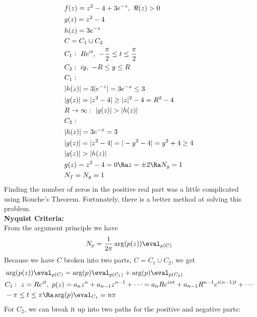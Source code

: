 \begin{align*}
    &f(z)=z^2-4+3e^{-z},\ \Re(z)>0\\
    &g(z)=z^2-4\\
    &h(z)=3e^{-z}\\
    &C=C_1\cup C_2\\
    &C_1:\ Re^{it},\ -\frac{\pi}{2}\leq t\leq \frac{\pi}{2}\\
    &C_2:\ iy,\ -R\leq y\leq R\\
    &C_1:\\
    &|h(z)|=3|e^{-z}|=3e^{-x}\leq 3\\
    &|g(z)|=|z^2-4|\geq|z|^2-4=R^2-4\\
    &R\to\infty:\ |g(z)|>|h(z)|\\
    &C_2:\\
    &|h(z)|=3e^{-x}=3\\
    &|g(z)|=|z^2-4|=|-y^2-4|=y^2+4\geq 4\\
    &|g(z)|>|h(z)|\\
    &g(z)=z^2-4=0\Ra z=\pm 2\Ra N_g=1\\
    &N_f=N_g=1
\end{align*}
Finding the number of zeros in the positive real part was a little complicated using Rouche's Theorem. Fortunately, there is a better method at solving this problem.\\
\textbf{Nyquist Criteria:}\\
From the argument principle we have
\[N_p=\frac{1}{2\pi}\arg(p(z))\eval_{p(C)}\]
Because we have $C$ broken into two parts, $C=C_1\cup C_2$, we get
\begin{align*}
    &\arg(p(z))\eval_{p(C)}=\arg(p)\eval_{p(C_1)}+\arg(p)\eval_{p(C_2)}\\
    &C_1:\ z=Re^{it},\ p(z)=a_nz^n+a_{n-1}z^{n-1}+\cdots=a_nRe^{int}+a_{n-1}R^{n-1}e^{i(n-1)t}+\cdots\\
    &-\pi\leq t\leq \pi\Ra \arg(p)\eval_{C_1}=n\pi
\end{align*}
For $C_2$, we can break it up into two paths for the positive and negative parts:
\begin{center}
\end{center}
